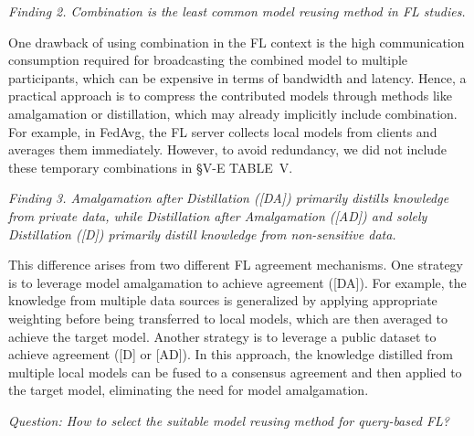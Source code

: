 \documentclass[journal]{IEEEtran}
\begin{document}
\begin{tcolorbox}
\textit{Finding 2. Combination is the least common model reusing method in FL studies.}
\end{tcolorbox}

One drawback of using combination in the FL context is the high communication consumption required for broadcasting the combined model to multiple participants, which can be expensive in terms of bandwidth and latency.
Hence, a practical approach is to compress the contributed models through methods like amalgamation or distillation, which may already implicitly include combination. 
For example, in FedAvg, the FL server collects local models from clients and averages them immediately. 
However, to avoid redundancy, we did not include these temporary combinations in \S{V-E} TABLE~V.

\begin{tcolorbox}
\textit{Finding 3. Amalgamation after Distillation ([DA]) primarily distills knowledge from private data, while Distillation after Amalgamation ([AD]) and solely Distillation ([D]) primarily distill knowledge from non-sensitive data.}
\end{tcolorbox}

This difference arises from two different FL agreement mechanisms. 
One strategy is to leverage model amalgamation to achieve agreement ([DA]). 
For example, the knowledge from multiple data sources is generalized by applying appropriate weighting before being transferred to local models, which are then averaged to achieve the target model.
Another strategy is to leverage a public dataset to achieve agreement ([D] or [AD]). 
In this approach, the knowledge distilled from multiple local models can be fused to a consensus agreement and then applied to the target model, eliminating the need for model amalgamation.

\begin{tcolorbox}
\textit{Question: How to select the suitable model reusing method for query-based FL?}%
\end{tcolorbox}
\end{document}
